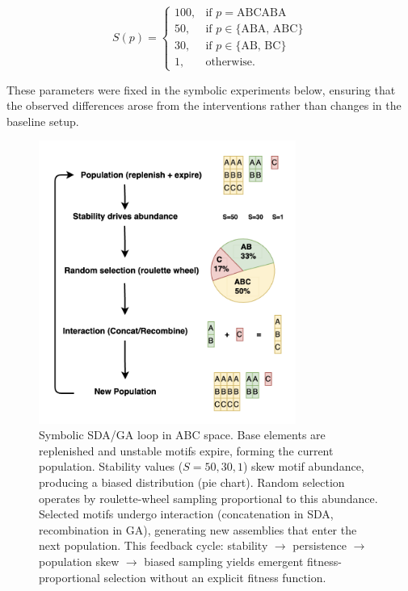\documentclass[life,article,submit,pdftex,moreauthors]{Definitions/mdpi}
\begin{document}
\begin{equation}
S(p) =
\begin{cases}
100, & \text{if } p = \text{ABCABA} \\
50, & \text{if } p \in \{\text{ABA, ABC}\} \\
30, & \text{if } p \in \{\text{AB, BC}\} \\
1, & \text{otherwise}.
\end{cases}
\end{equation}

These parameters were fixed in the symbolic experiments below, ensuring that the observed differences arose from the interventions rather than changes in
the baseline setup.

\begin{figure}[H]
    \centering
    \includegraphics[width=0.75\textwidth]{SDA-Sym.png}
    \caption{Symbolic SDA/GA loop in ABC space. 
    Base elements are replenished and unstable motifs expire, forming the current population. 
    Stability values ($S=50,30,1$) skew motif abundance, producing a biased distribution (pie chart). 
    Random selection operates by roulette-wheel sampling proportional to this abundance. 
    Selected motifs undergo interaction (concatenation in SDA, recombination in GA), 
    generating new assemblies that enter the next population. 
    This feedback cycle: stability $\to$ persistence $\to$ population skew $\to$ biased sampling yields emergent fitness-proportional selection without an explicit fitness function.}
    \label{fig:sda-loop}
\end{figure}
\end{document}
